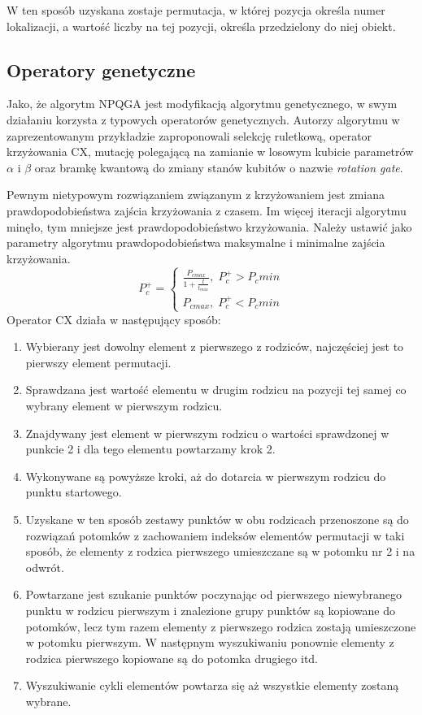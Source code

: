 W ten sposób uzyskana zostaje permutacja, w której pozycja określa numer lokalizacji, a wartość liczby na tej pozycji, określa przedzielony do niej obiekt.

\subsection{Operatory genetyczne}
Jako, że algorytm NPQGA jest modyfikacją algorytmu genetycznego, w swym działaniu korzysta z typowych operatorów genetycznych. Autorzy algorytmu w zaprezentowanym przykładzie zaproponowali selekcję ruletkową, operator krzyżowania CX, mutację polegającą na zamianie w losowym kubicie parametrów $\alpha$ i $\beta$ oraz bramkę kwantową do zmiany stanów kubitów o nazwie \textit{rotation gate}.

Pewnym nietypowym rozwiązaniem związanym z krzyżowaniem jest zmiana prawdopodobieństwa zajścia krzyżowania z czasem. Im więcej iteracji algorytmu minęło, tym mniejsze jest prawdopodobieństwo krzyżowania. Należy ustawić jako parametry algorytmu prawdopodobieństwa maksymalne i minimalne zajścia krzyżowania.
\newline
\begin{equation}
P_c^+= \left\{ \begin{array}{ccc} \frac{P_{c max}}{1+\frac{t}{t_{max}}}, \; P_c^+ > P_c min \\ P_{c max}, \; P_c^+ < P_c min \end{array} \right.
\end{equation}
\newline
Operator CX działa w następujący sposób:
\begin{enumerate}
\item Wybierany jest dowolny element z pierwszego z rodziców, najczęściej jest to pierwszy element permutacji.
\item Sprawdzana jest wartość elementu w drugim rodzicu na pozycji tej samej co wybrany element w pierwszym rodzicu.
\item Znajdywany jest element w pierwszym rodzicu o wartości sprawdzonej w punkcie 2 i dla tego elementu powtarzamy krok 2.
\item Wykonywane są powyższe kroki, aż do dotarcia w pierwszym rodzicu do punktu startowego.
\item Uzyskane w ten sposób zestawy punktów w obu rodzicach przenoszone są do rozwiązań potomków z zachowaniem indeksów elementów permutacji w taki sposób, że elementy z rodzica pierwszego umieszczane są w potomku nr 2 i na odwrót.
\item Powtarzane jest szukanie punktów poczynając od pierwszego niewybranego punktu w rodzicu pierwszym i znalezione grupy punktów są kopiowane do potomków, lecz tym razem elementy z pierwszego rodzica zostają umieszczone w potomku pierwszym. W następnym wyszukiwaniu ponownie elementy z rodzica pierwszego kopiowane są do potomka drugiego itd.
\item Wyszukiwanie cykli elementów powtarza się aż wszystkie elementy zostaną wybrane.
\end{enumerate}

